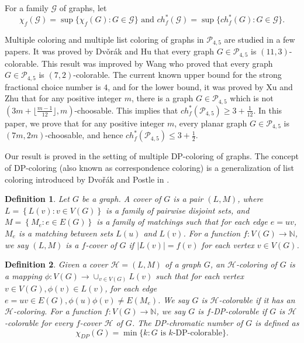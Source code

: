 \documentclass{article}
\newtheorem{definition}{Definition}
\begin{document}
For a family $\mathcal{G}$ of graphs, let 
$$\chi_f( \mathcal{G}) = \sup \{ \chi_f(G): G \in \mathcal{G}\}  \text{ and } ch_f^*(\mathcal{G}) = \sup \{ ch_f^*(G): G \in \mathcal{G}\}.$$

   
 Multiple coloring and multiple list coloring of graphs in $\mathcal{P}_{4,5}$ are studied in a few papers. It was proved by Dv\v{o}r\'{a}k and Hu \cite{DvorakHu11/3} that   every graph $G \in \mathcal{P}_{4,5}$ is $(11,3)$-colorable. This result was improved by Wang \cite{WangYingQian} who proved that every graph $G \in \mathcal{P}_{4,5}$ is $(7,2)$-colorable. The current known upper bound for the  strong fractional choice number is $4$, and for the lower bound, it was proved by Xu and Zhu \cite{XuZhuStrongfractionalchoicenumber} that for any positive integer $m$, there is a  graph $G \in \mathcal{P}_{4,5}$  which is not  $(3m+ \lfloor \frac {m-1}{12} \rfloor, m)$-choosable. This implies that $ch_f^*(\mathcal{P}_{4,5}) \ge 3 + \frac 1{12}$. In this paper, we prove that for any positive integer $m$, every planar graph $G \in \mathcal{P}_{4,5}$ is $(7m,2m)$-choosable, and hence $ch_f^*(\mathcal{P}_{4,5}) \le 3 + \frac 12$.

Our result is proved in the setting of multiple DP-coloring of graphs.  
The concept of DP-coloring (also known as correspondence coloring) is a generalization of list coloring introduced by Dvo{\v{r}}{\'a}k and Postle in \cite{dvovrak2018correspondence}. 

\begin{definition}
    Let $G$ be a graph. A \textit{ cover} of $G$ is a pair $(L,M)$, where $L=\left \{ L(v): v\in V(G) \right \} $ is a family of pairwise disjoint sets, and $M=\left \{ M_e: e\in E(G) \right \} $ is a family of matchings such that for each edge $e=uv$, $M_e$ is a   matching between sets $L(u)$ and $L(v)$. For a function $f:V(G)\to \mathbb{N}$, we say $(L,M)$ is a $f$-cover of $G$ if $\left | L(v) \right | = f(v)$ for each vertex $v\in V(G)$.   
\end{definition}


\begin{definition}
    Given a cover $\mathcal{H}=(L,M)$ of a graph $G$, an $\mathcal{H}$-coloring of $G$ is a mapping $\phi: V(G) \to \cup_{v\in V(G)}L(v)$ such that for each vertex $v\in V(G), \phi(v) \in L(v)$, for each edge $e=uv\in E(G), \phi(u) \phi(v)\ne E(M_e)$. We say $G$ is \textit{$\mathcal{H}$-colorable} if it has an $\mathcal{H}$-coloring. For a function $f: V(G) \to \mathbb{N} $, we say $G$ is \textit{$f$-DP-colorable} if $G$ is  $\mathcal{H}$-colorable for every $f$-cover $\mathcal{H}$ of $G$.
    The DP-chromatic number of $G$ is defined as 
    $$\chi_{DP}(G) = \min\{k: G \text{ is $k$-DP-colorable}\}.$$
\end{definition}
\end{document}

